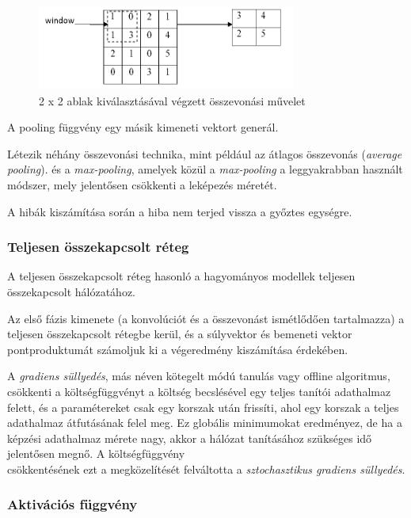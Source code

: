 \documentclass[12pt,a4]{article}
\begin{document}
	\begin{figure}[h]	
		\centering
		\includegraphics[width=0.7\linewidth]{pooling}
		\caption{\cite{CNN} 2 x 2 ablak kiválasztásával végzett összevonási művelet}
	\end{figure}
	
	\newpage
	
	A pooling függvény egy másik kimeneti vektort generál.
	
	
	Létezik néhány összevonási technika, mint például az átlagos összevonás (\textit{average pooling}). 
	és a \textit{max-pooling}, amelyek közül a \textit{max-pooling} a leggyakrabban használt módszer,
	mely jelentősen csökkenti a leképezés méretét.
	
	
	A hibák kiszámítása során a hiba nem terjed vissza a győztes egységre.
	
	\subsubsection{Teljesen összekapcsolt réteg}
	
	A teljesen összekapcsolt réteg \cite{CNN} hasonló a hagyományos modellek teljesen összekapcsolt hálózatához.
	
	
	Az első
	fázis kimenete (a konvolúciót és a összevonást ismétlődően tartalmazza) a teljesen összekapcsolt rétegbe kerül, és a súlyvektor és bemeneti vektor pontproduktumát számoljuk ki a végeredmény kiszámítása érdekében.
	
	
	A \textit{gradiens süllyedés}, más néven kötegelt módú tanulás vagy offline algoritmus, csökkenti a költségfüggvényt a költség becslésével egy teljes tanítói adathalmaz felett, és a paramétereket csak egy korszak után frissíti, ahol egy korszak a teljes adathalmaz átfutásának felel meg.
	Ez globális minimumokat eredményez, de ha a képzési adathalmaz mérete nagy, akkor a hálózat tanításához szükséges idő
	jelentősen megnő. A költségfüggvény
	\\
	csökkentésének ezt a megközelítését felváltotta a \textit{sztochasztikus gradiens süllyedés}.
	\subsubsection{Aktivációs függvény}
	
\end{document}
